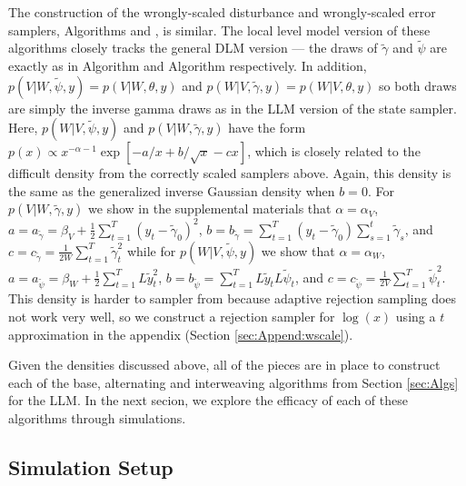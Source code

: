 \documentclass{article}
\begin{document}
The construction of the wrongly-scaled disturbance and wrongly-scaled error samplers, Algorithms  and , is similar. The local level model version of these algorithms closely tracks the general DLM version --- the draws of $\tilde{\gamma}$ and $\tilde{\psi}$ are exactly as in Algorithm  and Algorithm  respectively. In addition, $p(V|W,\tilde{\psi},y)=p(V|W,\theta,y)$ and $p(W|V,\tilde{\gamma},y)=p(W|V,\theta,y)$ so both draws are simply the inverse gamma draws as in the LLM version of the state sampler. Here, $p(W|V,\tilde{\psi},y)$ and $p(V|W,\tilde{\gamma},y)$ have the form $p(x)\propto x^{-\alpha-1}\exp\left[ -a/x + b/\sqrt{x} -c x\right]$, which is closely related to the difficult density from the correctly scaled samplers above. Again, this density is the same as the generalized inverse Gaussian density when $b=0$. For $p(V|W,\tilde{\gamma},y)$ we show in the supplemental materials that $\alpha=\alpha_V$, $a = a_{\tilde{\gamma}} = \beta_V + \frac{1}{2}\sum_{t=1}^T(y_t - \tilde{\gamma}_0)^2$, $b = b_{\tilde{\gamma}} = \sum_{t=1}^T(y_t - \tilde{\gamma}_0)\sum_{s=1}^t\tilde{\gamma}_s$, and $c = c_{\tilde{\gamma}} = \frac{1}{2W}\sum_{t=1}^T\tilde{\gamma}_t^2$ while for $p(W|V,\tilde{\psi},y)$ we show that $\alpha=\alpha_W$,   $a = a_{\tilde{\psi}} = \beta_W + \frac{1}{2}\sum_{t=1}^TL\tilde{y}_t^2$,  $b = b_{\tilde{\psi}} = \sum_{t=1}^TL\tilde{y}_tL\tilde{\psi}_t$, and $c = c_{\tilde{\psi}} = \frac{1}{2V}\sum_{t=1}^T\tilde{\psi}_t^2$. This density is harder to sampler from because adaptive rejection sampling does not work very well, so we construct a rejection sampler for $\log(x)$ using a $t$ approximation in the appendix (Section \ref{sec:Append:wscale}).

Given the densities discussed above, all of the pieces are in place to construct each of the base, alternating and interweaving algorithms from Section \ref{sec:Algs} for the LLM. In the next secion, we explore the efficacy of each of these algorithms through simulations.

\subsection{Simulation Setup}
\end{document}
